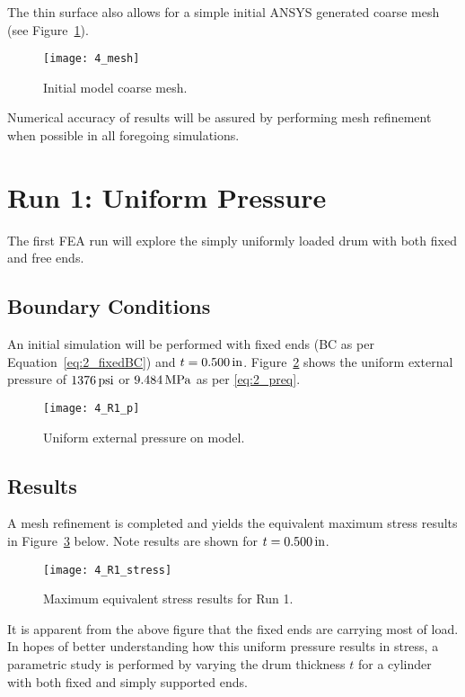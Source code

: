 The thin surface also allows for a simple initial ANSYS generated coarse mesh (see Figure~\ref{fig:4_mesh}).

\begin{figure}[H]
	\centering
	\texttt{[image: 4\_mesh]}
	\caption{Initial model coarse mesh.}
	\label{fig:4_mesh}
\end{figure}

Numerical accuracy of results will be assured by performing mesh refinement when possible in all foregoing simulations.

\section{Run 1: Uniform Pressure}
\label{section:4_R1}

The first FEA run will explore the simply uniformly loaded drum with both fixed and free ends. 

\subsection{Boundary Conditions}
\label{subsection:R1BC}

An initial simulation will be performed with fixed ends (BC as per Equation~\ref{eq:2_fixedBC}) and $t=0.500\,\mathrm{in}$. Figure~\ref{fig:4_R1_p} shows the uniform external pressure of $1376 \,\mathrm{psi}$ or $9.484 \,\mathrm{MPa}$ as per \ref{eq:2_preq}.
\begin{figure}[H]
	\centering
	\texttt{[image: 4\_R1\_p]}
	\caption{Uniform external pressure on model.}
	\label{fig:4_R1_p}
\end{figure}

\subsection{Results}

A mesh refinement is completed and yields the equivalent maximum stress results in Figure~\ref{fig:4_R1_stress} below. Note results are shown for $t=0.500\,\mathrm{in}$.

\begin{figure}[H]
	\centering
	\texttt{[image: 4\_R1\_stress]}
	\caption{Maximum equivalent stress results for Run 1.}
	\label{fig:4_R1_stress}
\end{figure}

It is apparent from the above figure that the fixed ends are carrying most of load. In hopes of better understanding how this uniform pressure results in stress, a parametric study is performed by varying the drum thickness $t$ for a cylinder with both fixed and simply supported ends.

